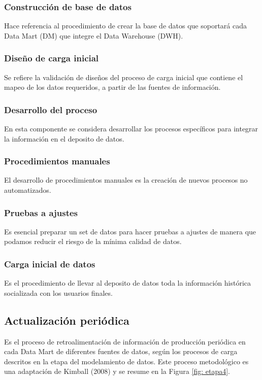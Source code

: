 \documentclass[11pt,titlepage]{report}
\begin{document}
\subsubsection{Construcción de base de datos} 
Hace referencia al procedimiento de crear la base de datos que soportará cada Data Mart (DM) que integre el Data Warehouse (DWH).

\subsubsection{Diseño de carga inicial} 	
Se refiere la validación de diseños del proceso de carga inicial que contiene el mapeo de los datos requeridos, a partir de las fuentes de información.

\subsubsection{Desarrollo del proceso} 
En esta componente se considera desarrollar los procesos específicos para integrar la información en el deposito de datos.

\subsubsection{Procedimientos manuales} 
El desarrollo de procedimientos manuales es la creación de nuevos procesos no
automatizados.

\subsubsection{Pruebas a ajustes} 
Es esencial preparar un set de datos para hacer pruebas a ajustes de manera que podamos reducir el riesgo de la mínima calidad de datos.

\subsubsection{Carga inicial de datos} 
Es el procedimiento de llevar al deposito de datos toda la información histórica socializada con los usuarios finales.	


\subsection{Actualización periódica}
Es el proceso de retroalimentación de información de producción periódica en cada Data Mart de diferentes fuentes de datos, según los procesos de carga descritos en la etapa del modelamiento de datos. Este proceso metodológico es una adaptación de Kimball (2008) y se resume en la Figura \ref{fig: etapa4}.
\end{document}
